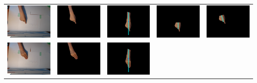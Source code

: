 \begin{tabular}{lllll}
\includegraphics[width=3.5cm]{fig4/1-a.png} &
\includegraphics[width=3.5cm]{fig4/1-b.png} &
\includegraphics[width=3.5cm]{fig4/1-c.png} &
\includegraphics[width=3.5cm]{fig4/1-d.png} &
\includegraphics[width=3.5cm]{fig4/1-e.png} \\
\includegraphics[width=3.5cm]{fig4/2-a.png} &
\includegraphics[width=3.5cm]{fig4/2-b.png} &
\includegraphics[width=3.5cm]{fig4/2-c.png} &

\end{tabular}
